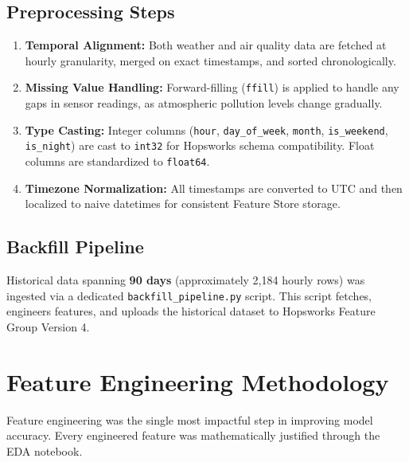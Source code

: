 \documentclass[11pt,a4paper]{article}
\begin{document}
\subsection{Preprocessing Steps}
\begin{enumerate}
    \item \textbf{Temporal Alignment:} Both weather and air quality data are fetched at hourly granularity, merged on exact timestamps, and sorted chronologically.
    \item \textbf{Missing Value Handling:} Forward-filling (\texttt{ffill}) is applied to handle any gaps in sensor readings, as atmospheric pollution levels change gradually.
    \item \textbf{Type Casting:} Integer columns (\texttt{hour}, \texttt{day\_of\_week}, \texttt{month}, \texttt{is\_weekend}, \texttt{is\_night}) are cast to \texttt{int32} for Hopsworks schema compatibility. Float columns are standardized to \texttt{float64}.
    \item \textbf{Timezone Normalization:} All timestamps are converted to UTC and then localized to naive datetimes for consistent Feature Store storage.
\end{enumerate}

\subsection{Backfill Pipeline}
Historical data spanning \textbf{90 days} (approximately 2,184 hourly rows) was ingested via a dedicated \texttt{backfill\_pipeline.py} script. This script fetches, engineers features, and uploads the historical dataset to Hopsworks Feature Group Version 4.

\section{Feature Engineering Methodology}

Feature engineering was the single most impactful step in improving model accuracy. Every engineered feature was mathematically justified through the EDA notebook.
\end{document}
